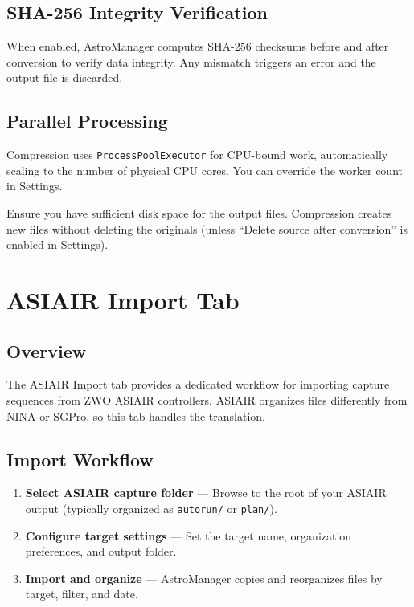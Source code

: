\documentclass[11pt,a4paper]{article}
\begin{document}
\subsection{SHA-256 Integrity Verification}

When enabled, AstroManager computes SHA-256 checksums before and after conversion to verify data integrity. Any mismatch triggers an error and the output file is discarded.

\subsection{Parallel Processing}

Compression uses \texttt{ProcessPoolExecutor} for CPU-bound work, automatically scaling to the number of physical CPU cores. You can override the worker count in Settings.

\begin{warningbox}
Ensure you have sufficient disk space for the output files. Compression creates new files without deleting the originals (unless ``Delete source after conversion'' is enabled in Settings).
\end{warningbox}


\section{ASIAIR Import Tab}
\label{sec:asiair}

\subsection{Overview}

The ASIAIR Import tab provides a dedicated workflow for importing capture sequences from ZWO ASIAIR controllers. ASIAIR organizes files differently from NINA or SGPro, so this tab handles the translation.

\subsection{Import Workflow}

\begin{enumerate}
    \item \textbf{Select ASIAIR capture folder} --- Browse to the root of your ASIAIR output (typically organized as \texttt{autorun/} or \texttt{plan/}).
    \item \textbf{Configure target settings} --- Set the target name, organization preferences, and output folder.
    \item \textbf{Import and organize} --- AstroManager copies and reorganizes files by target, filter, and date.
\end{enumerate}
\end{document}
